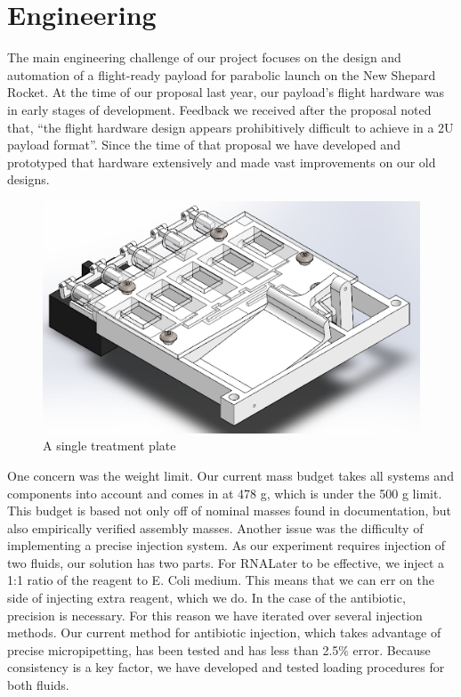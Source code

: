 \documentclass[twocolumn]{article}
\begin{document}
\section{Engineering}
The main engineering challenge of our project focuses on the design and automation of a flight-ready payload for parabolic launch on the New Shepard Rocket. At the time of our proposal last year, our payload’s flight hardware was in early stages of development. Feedback we received after the proposal noted that, “the flight hardware design appears prohibitively difficult to achieve in a 2U payload format”. Since the time of that proposal we have developed and prototyped that hardware extensively and made vast improvements on our old designs.
\begin{figure}[h]
    \centering
    \includegraphics[scale = 0.40]{images/plate.png}
    \caption{A single treatment plate}
    \label{fig:my_label}
\end{figure}
One concern was the weight limit. Our current mass budget takes all systems and components into account and comes in at 478 g, which is under the 500 g limit. This budget is based not only off of nominal masses found in documentation, but also empirically verified assembly masses. Another issue was the difficulty of implementing a precise injection system. As our experiment requires injection of two fluids, our solution has two parts. For RNALater to be effective, we inject a 1:1 ratio of the reagent to E. Coli medium. This means that we can err on the side of injecting extra reagent, which we do. In the case of the antibiotic, precision is necessary. For this reason we have iterated over several injection methods. Our current method for antibiotic injection, which takes advantage of precise micropipetting, has been tested and has less than 2.5\% error. Because consistency is a key factor, we have developed and tested loading procedures for both fluids.
\end{document}
